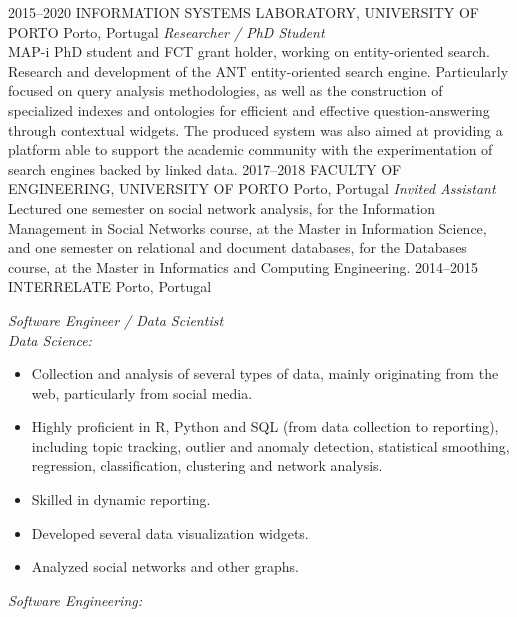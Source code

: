 \documentclass{friggeri-cv}
\begin{document}
\begin{entrylist}
\entry
{2015--2020}
{INFORMATION SYSTEMS LABORATORY, UNIVERSITY OF PORTO}
{Porto, Portugal}
{\emph{Researcher / PhD Student}\\
MAP-i PhD student and FCT grant holder, working on entity-oriented search. Research and development of the ANT entity-oriented search engine. Particularly focused on query analysis methodologies, as well as the construction of specialized indexes and ontologies for efficient and effective question-answering through contextual widgets. The produced system was also aimed at providing a platform able to support the academic community with the experimentation of search engines backed by linked data.}
\entry
{2017--2018}
{FACULTY OF ENGINEERING, UNIVERSITY OF PORTO}
{Porto, Portugal}
{\emph{Invited Assistant}\\
Lectured one semester on social network analysis, for the Information Management in Social Networks course, at the Master in Information Science, and one semester on relational and document databases, for the Databases course, at the Master in Informatics and Computing Engineering.}
\entry
{2014--2015}
{INTERRELATE}
{Porto, Portugal}
{\emph{Software Engineer / Data Scientist}\\[0.3em]
{\normalsize \emph{Data Science:}}
\vspace{0.175em}
{\normalsize \begin{itemize}
  \setlength\itemsep{.0175em}
  \item Collection and analysis of several types of data, mainly originating from the web, particularly from social media.
  \item Highly proficient in R, Python and SQL (from data collection to reporting), including topic tracking, outlier and anomaly detection, statistical smoothing, regression, classification, clustering and network analysis.
  \item Skilled in dynamic reporting.
  \item Developed several data visualization widgets.
  \item Analyzed social networks and other graphs.
\end{itemize}}
\vspace{0.3em}
{\normalsize \emph{Software Engineering:}}
\vspace{0.175em}
{\normalsize \begin{itemize}

\end{itemize}}}
\end{entrylist}
\end{document}
